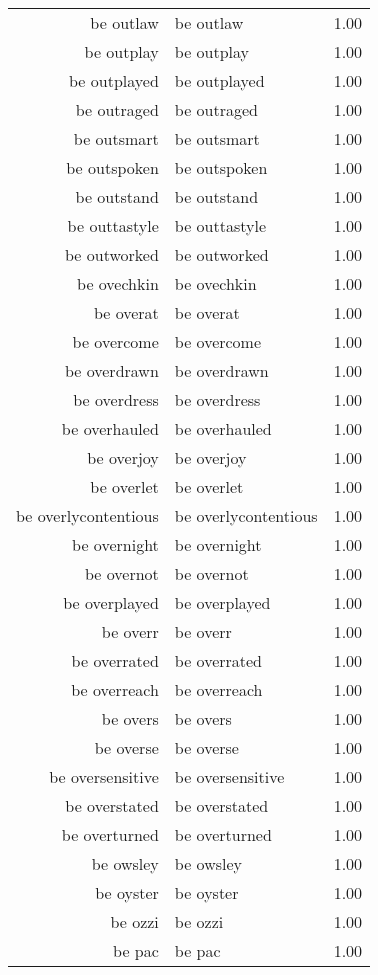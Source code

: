 \begin{table}[ht]
\begin{tabular}{rlr}
  be outlaw & be outlaw & 1.00 \\ 
  be outplay & be outplay & 1.00 \\ 
  be outplayed & be outplayed & 1.00 \\ 
  be outraged & be outraged & 1.00 \\ 
  be outsmart & be outsmart & 1.00 \\ 
  be outspoken & be outspoken & 1.00 \\ 
  be outstand & be outstand & 1.00 \\ 
  be outtastyle & be outtastyle & 1.00 \\ 
  be outworked & be outworked & 1.00 \\ 
  be ovechkin & be ovechkin & 1.00 \\ 
  be overat & be overat & 1.00 \\ 
  be overcome & be overcome & 1.00 \\ 
  be overdrawn & be overdrawn & 1.00 \\ 
  be overdress & be overdress & 1.00 \\ 
  be overhauled & be overhauled & 1.00 \\ 
  be overjoy & be overjoy & 1.00 \\ 
  be overlet & be overlet & 1.00 \\ 
  be overlycontentious & be overlycontentious & 1.00 \\ 
  be overnight & be overnight & 1.00 \\ 
  be overnot & be overnot & 1.00 \\ 
  be overplayed & be overplayed & 1.00 \\ 
  be overr & be overr & 1.00 \\ 
  be overrated & be overrated & 1.00 \\ 
  be overreach & be overreach & 1.00 \\ 
  be overs & be overs & 1.00 \\ 
  be overse & be overse & 1.00 \\ 
  be oversensitive & be oversensitive & 1.00 \\ 
  be overstated & be overstated & 1.00 \\ 
  be overturned & be overturned & 1.00 \\ 
  be owsley & be owsley & 1.00 \\ 
  be oyster & be oyster & 1.00 \\ 
  be ozzi & be ozzi & 1.00 \\ 
  be pac & be pac & 1.00 \\ 

\end{tabular}
\end{table}
